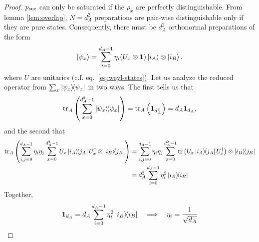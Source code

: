     \selftest*
    \begin{proof}
        $p_{\text{suc}}$ can only be saturated if the $\rho_x$ are perfectly distinguishable. From lemma \ref{lem:overlap}, $N = d_A^2$ preparations are pair-wise distinguishable only if they are pure states. Consequently, there must be $d_A^2$ orthonormal preparations of the form
        $$
            \ket{\psi_x} = \sum_{i = 0}^{d_A - 1} \eta_i (U_x \otimes \mathbf{1}) \ket{i_A} \otimes \ket{i_B} ,
        $$
        where $U$ are unitaries (c.f. eq.~\eqref{eq:weyl-states}). Let us analyze the reduced operator from $\sum_x \ketbra{\psi_x}{\psi_x}$ in two ways. The first tells us that
        $$
            \text{tr}_{A}\left( \sum_{x=0}^{d_A^2 - 1} \ketbra{\psi_x}{\psi_x} \right) = \text{tr}_{A}\left( \mathbf{1}_{d_A^2} \right) = d_A \mathbf{1}_{d_A} ,
        $$
        and the second that
        \begin{align*}
            \text{tr}_{A}\left( \sum_{i,j=0}^{d_A - 1} \eta_i \eta_j \sum_{x=0}^{d_A^2 - 1} U_x \ketbra{i_A}{j_A} U_x^\dagger \otimes \ketbra{i_B}{j_B} \right)
            &= \sum_{i,j=0}^{d_A - 1} \eta_i \eta_j \sum_{x=0}^{d_A^2 - 1} \text{tr}\left( U_x \ketbra{i_A}{j_A} U_x^\dagger \right) \otimes \ketbra{i_B}{j_B} \\
            &= d_A^2 \sum_{i=0}^{d_A - 1} \eta_i^2 \ketbra{i_B}{i_B}
        \end{align*}
        Together,
        $$
            \mathbf{1}_{d_A} = d_A \sum_{i=0}^{d_A-1} \eta_i^2 \ketbra{i_B}{i_B} \quad\Longrightarrow\quad \eta_i = \frac{1}{\sqrt{d_A}}
        $$
    \end{proof}


